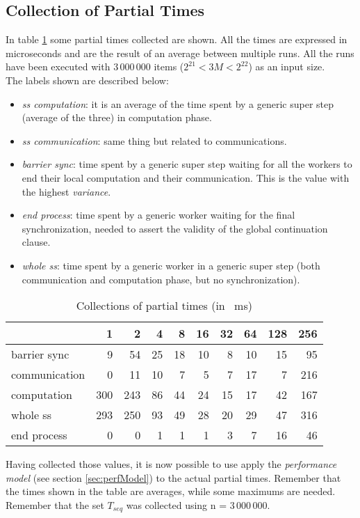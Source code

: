 \documentclass[]{article}
\begin{document}
\subsection{Collection of Partial Times}
\label{sec:tseq}
In table \ref{tab:tseq} some partial times collected are shown. All the times are expressed in microseconds and are the result of an average between multiple runs. All the runs have been executed with $3\,000\,000$ items ($2^{21} < 3M < 2^{22}$) as an input size.\\ 
The labels shown are described below:
\begin{itemize}
	\item \emph{ss computation}: it is an average of the time spent by a generic super step (average of the three) in computation phase.
	\item \emph{ss communication}: same thing but related to communications.
	\item \emph{barrier sync}: time spent by a generic super step waiting for all the workers to end their local computation and their communication. This is the value with the highest \emph{variance}.
	\item \emph{end process}: time spent by a generic worker waiting for the final synchronization, needed to assert the validity of the global continuation clause.
	\item \emph{whole ss}: time spent by a generic worker in a generic super step (both communication and computation phase, but no synchronization).
\end{itemize}
\begin{table}[H]
	\centering
	\begin{tabular}{l|*{9}r}
		\toprule
		\diagbox{phase}{$\mathit{nw}$} 
		& 1 & 2 & 4 & 8 & 16 & 32 & 64 & 128 & 256 \\
		\midrule
		barrier sync & 9 & 54 & 25 & 18 & 10 & 8 & 10 & 15 & 95 \\
		communication & 0 & 11 & 10 & 7 & 5 & 7 & 17 & 7 & 216 \\
		computation & 300 & 243 & 86 & 44 & 24 & 15 & 17 & 42 & 167 \\
		whole ss & 293 & 250 & 93 & 49 & 28 & 20 & 29 & 47 & 316 \\
		end process & 0 & 0 & 1 & 1 & 1 & 3 & 7 & 16 & 46 \\
		\bottomrule
	\end{tabular}%
	\caption{Collections of partial times (in \SI{}{\milli \second})}
	\label{tab:tseq}%
\end{table}%
Having collected those values, it is now possible to use apply the \emph{performance model} (see section \ref{sec:perfModel}) to the actual partial times. Remember that the times shown in the table are averages, while some maximums are needed. Remember that the set $T_{seq}$ was collected using n = $3\,000\,000$. \\
\end{document}
